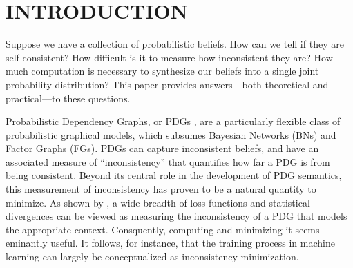\documentclass[twoside]{article}
\begin{document}



\section{INTRODUCTION}

Suppose we have a collection of probabilistic beliefs. 
How can we tell if they are self-consistent?
How difficult is it to measure how inconsistent they are?
How much computation is necessary to synthesize our beliefs into a single joint probability distribution?
This paper provides answers---both
theoretical and practical---to these questions. 


Probabilistic Dependency Graphs, or PDGs \parencite{pdg-aaai},
are a particularly flexible class of probabilistic graphical models, which subsumes Bayesian Networks (BNs) 
and Factor Graphs (FGs). 
PDGs can capture inconsistent beliefs, and have an associated measure
of ``inconsistency'' that quantifies how far a PDG is from being consistent.  
Beyond its central role in the development of PDG semantics, this measurement of inconsistency has proven to be a natural quantity to minimize.
As shown by \textcite{one-true-loss}, a wide breadth
    of loss functions and statistical divergences 
    can be viewed as measuring the inconsistency
    of a PDG that models the appropriate context.  
Consquently, computing and minimizing it seems eminantly useful.
It follows, for instance, that the training process in machine learning can largely be conceptualized as inconsistency minimization. 
\end{document}
